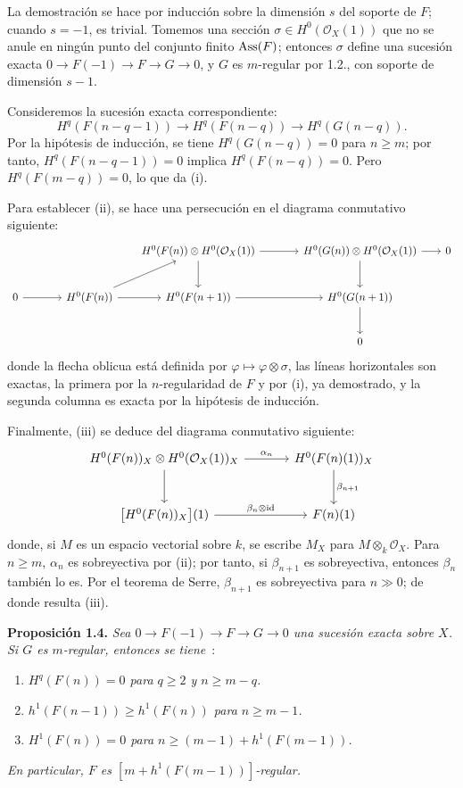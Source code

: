 La demostración se hace por inducción sobre la dimensión \(s\) del soporte
de \(F\); cuando \(s=-1\), es trivial. Tomemos una sección
\(\sigma\in H^0(\mathcal O_X(1))\) que no se anule en ningún punto del
conjunto finito \(\operatorname{Ass}(F)\); entonces \(\sigma\) define una sucesión exacta
\(0\longrightarrow F(-1)\longrightarrow F\longrightarrow G\longrightarrow 0\),
y \(G\) es \(m\)-regular por 1.2., con soporte de dimensión \(s-1\).

Consideremos la sucesión exacta correspondiente:
\[
H^q(F(n-q-1))\longrightarrow H^q(F(n-q))\longrightarrow H^q(G(n-q)).
\]
Por la hipótesis de inducción, se tiene \(H^q(G(n-q))=0\) para
\(n\ge m\); por tanto, \(H^q(F(n-q-1))=0\) implica
\(H^q(F(n-q))=0\). Pero \(H^q(F(m-q))=0\), lo que da (i).

Para establecer (ii), se hace una persecución en el diagrama conmutativo
siguiente:
\[
\begin{tikzcd}[column sep=1.8em,row sep=2.5em]
 & & & H^0(F(n))\otimes H^0(\mathcal O_X(1)) \arrow[rr] \arrow[d]
 & & H^0(G(n))\otimes H^0(\mathcal O_X(1)) \arrow[r] \arrow[d]
 & 0 \\
0 \arrow[rr]
& & H^0(F(n)) \arrow[ur] \arrow[r]
& H^0(F(n+1)) \arrow[rr]
& & H^0(G(n+1)\sisi{}{)} \arrow[d] \\ %
& & & & & 0
\end{tikzcd}
\]
donde la flecha oblicua está definida por
\(\varphi\mapsto\varphi\otimes\sigma\), las líneas horizontales son exactas,
la primera por la \(n\)-regularidad de \(F\) y por (i), ya demostrado, y la
segunda columna es exacta por la hipótesis de inducción.

Finalmente, (iii) se deduce del diagrama conmutativo siguiente:
\[
\begin{tikzcd}[column sep=large,row sep=large]
H^0(F(n))_X\otimes H^0(\mathcal O_X(1))_X
  \arrow[r,"\alpha_n"]
  \arrow[d]
& H^0(F(n)(1))_X
  \arrow[d,"\beta_{n+1}"] \\
\bigl[H^0(F(n))_X\bigr](1)
  \arrow[r,"\beta_n\otimes\mathrm{id}"]
& F(n)(1)
\end{tikzcd}
\]
donde, si \(M\) es un espacio vectorial sobre \(k\), se escribe \(M_X\) para
\(M\otimes_k\mathcal O_X\). Para \(n\ge m\), \(\alpha_n\) es sobreyectiva
por (ii); por tanto, si \(\beta_{n+1}\) es sobreyectiva, entonces
\(\beta_n\) también lo es. Por el teorema de Serre, \(\beta_{n+1}\) es
sobreyectiva para \(n\gg0\); de donde resulta (iii).

\textbf{Proposición 1.4.} \emph{Sea \(0\to F(-1)\to F\to G\to0\) una
sucesión exacta sobre \(X\). Si \(G\) es \(m\)-regular, entonces se tiene}~:
\begin{enumerate}[label=(\roman*)]
\item \emph{\(H^q(F(n))=0\) para \(q\ge2\) y \(n\ge m-q\).}
\item \emph{\(h^1(F(n-1))\ge h^1(F(n))\) para \(n\ge m-1\).}
\item \emph{\(H^1(F(n))=0\) para \(n\ge (m-1)+h^1(F(m-1))\).}
\end{enumerate}
\emph{En particular, \(F\) es
\([m+h^1(F(m-1))]\)-regular.}

